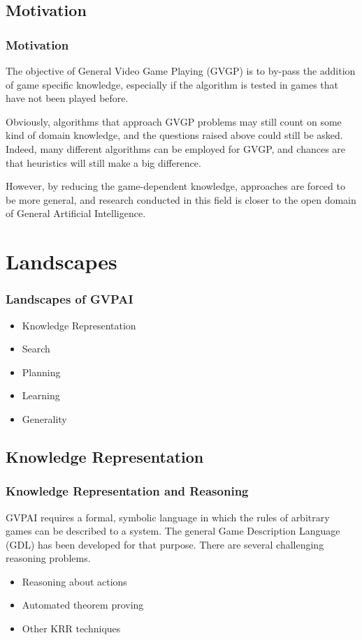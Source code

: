 \documentclass{beamer}
\begin{document}
\subsection{Motivation}
\begin{frame}
  \frametitle{Motivation\cite{2}}
  The objective of General Video Game Playing (GVGP) is to by-pass the addition of game specific knowledge, especially if the algorithm is tested in games that have not been played before.

  Obviously, algorithms that approach GVGP problems may still count on some kind of domain knowledge, and the questions raised above could still be asked. Indeed, many different algorithms can be employed for GVGP, and chances are that heuristics will still make a big difference. 
  
  However, by reducing the game-dependent knowledge, approaches are forced to be more general, and research conducted in this field is closer to the open domain of General Artificial Intelligence.
  
\end{frame}



\section{Landscapes}
\begin{frame}
\frametitle{Landscapes of GVPAI}
\begin{itemize}
\item Knowledge Representation
\item Search
\item Planning
\item Learning
\item Generality
\end{itemize}
\end{frame}

\subsection{Knowledge Representation}
\begin{frame}
\frametitle{Knowledge Representation and Reasoning\cite{3}}
GVPAI requires a formal, symbolic language in which the rules of arbitrary games can be described to a system. The general Game Description Language (GDL) has been developed for that purpose. There are several challenging reasoning problems.
\begin{itemize}
  \item Reasoning about actions
  \item Automated theorem proving
  \item Other KRR techniques
\end{itemize}
\end{frame}
\end{document}
